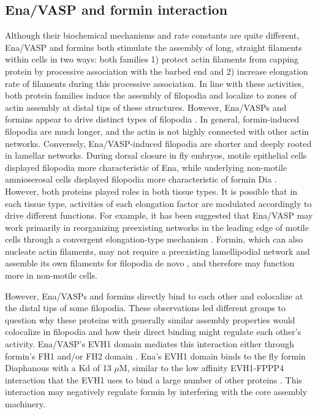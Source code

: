\subsection{Ena/VASP and formin interaction}\label{ena-formin-interaction}
Although their biochemical mechanisms and rate constants are quite different, Ena/VASP and formins both stimulate the assembly of long, straight filaments within cells in two ways: both families 1) protect actin filaments from capping protein by processive association with the barbed end and 2) increase elongation rate of filaments during this processive association. In line with these activities, both protein families induce the assembly of filopodia \citep{bilancia_enabled_2014,homem_exploring_2009} and localize to zones of actin assembly at distal tips of these structures. However, Ena/VASPs and formins appear to drive distinct types of filopodia \citep{barzik_ena/vasp_2014,bilancia_enabled_2014,nowotarski_actin_2014,homem_exploring_2009}. In general, formin-induced filopodia are much longer, and the actin is not highly connected with other actin networks. Conversely, Ena/VASP-induced filopodia are shorter and deeply rooted in lamellar networks. During dorsal closure in fly embryos, motile epithelial cells displayed filopodia more characteristic of Ena, while underlying non-motile amnioserosal cells displayed filopodia more characteristic of formin Dia \citep{nowotarski_actin_2014}. However, both proteins played roles in both tissue types. It is possible that in each tissue type, activities of each elongation factor are modulated accordingly to drive different functions. For example, it has been suggested that Ena/VASP may work primarily in reorganizing preexisting networks in the leading edge of motile cells through a convergent elongation-type mechanism \citep{svitkina_mechanism_2003}. Formin, which can also nucleate actin filaments, may not require a preexisting lamellipodial network and assemble its own filaments for filopodia de novo \citep{faix_filopodia:_2009}, and therefore may function more in non-motile cells. 

However, Ena/VASPs and formins directly bind to each other and colocalize at the distal tips of some filopodia. These observations led different groups to question why these proteins with generally similar assembly properties would colocalize in filopodia and how their direct binding might regulate each other's activity. Ena/VASP's EVH1 domain mediates this interaction either through formin's FH1 \citep{bilancia_enabled_2014} and/or FH2 domain \citep{barzik_ena/vasp_2014,schirenbeck_bundling_2006}. Ena's EVH1 domain binds to the fly formin Diaphanous with a Kd of 13 $\mu$M, similar to the low affinity EVH1-FPPP4 interaction that the EVH1 uses to bind a large number of other proteins \citep{prehoda_structure_1999}. This interaction may negatively regulate formin by interfering with the core assembly machinery. 

